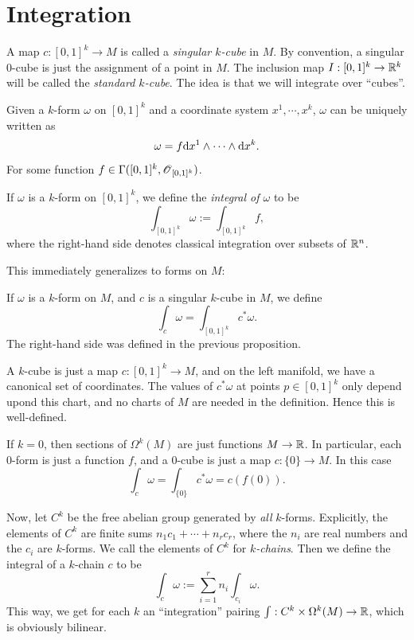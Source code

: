 \documentclass[11pt, english]{article}
\begin{document}
\newpage
\section{Integration}

A map $c:[0,1]^k \to M$ is called a \emph{singular $k$-cube} in $M$. By convention, a singular $0$-cube is just the assignment of a point in $M$. The inclusion map $I:[0,1]^k \to \mathbb{R}^k$ will be called the \emph{standard $k$-cube}. The idea is that we will integrate over ``cubes''.

Given a $k$-form $\omega$ on $[0,1]^k$ and a coordinate system $x^1,\cdots,x^k$, $\omega$ can be uniquely written as 
\[
 \omega = f \mathrm{d}{x}^1 \wedge \cdots \wedge \mathrm{d}{x}^k.
\]
For some function $f \in \Gamma([0,1]^k, \operatorname{\mathscr{O}}_{[0,1]^k})$. 
\begin{defi}
If $\omega$ is a $k$-form on $[0,1]^k$, we define the \emph{integral of $\omega$} to be
\[
\int_{[0,1]^k} \omega := \int_{[0,1]^k} f,
\]
where the right-hand side denotes classical integration over subsets of $\mathbb{R}^n$.
\end{defi}

This immediately generalizes to forms on $M$:
\begin{defi}
  If $\omega$ is a $k$-form on $M$, and $c$ is a singular $k$-cube in $M$, we define
\[
\int_c \omega = \int_{[0,1]^k} c^\ast \omega.
\]
The right-hand side was defined in the previous proposition.
\end{defi}
\begin{remark}
A $k$-cube is just a map $c:[0,1]^k \to M$, and on the left manifold, we have a canonical set of coordinates. The values of $c^\ast \omega$ at points $p \in [0,1]^k$ only depend upond this chart, and no charts of $M$ are needed in the definition. Hence this is well-defined.
\end{remark}
\begin{remark}
  If $k=0$, then sections of $\Omega^k(M)$ are just functions $M \to \mathbb{R}$. In particular, each $0$-form is just a function $f$, and a $0$-cube is just a map $c:\{ 0 \} \to M$. In this case
\[
\int_c \omega = \int_{\{ 0 \}} c^\ast \omega = c(f(0)).
\]
\end{remark}

Now, let $C^k$ be the free abelian group generated by \emph{all} $k$-forms. Explicitly, the elements of $C^k$ are finite sums $n_1c_1+\cdots+n_rc_r$, where the $n_i$ are real numbers and the $c_i$ are $k$-forms. We call the elements of $C^k$ for \emph{$k$-chains}. Then we define the integral of a $k$-chain $c$ to be
\[
\int_c \omega := \sum_{i=1}^r n_i \int_{c_i} \omega.
\]
This way, we get for each $k$ an ``integration'' pairing $\int:C^k \times \Omega^k(M) \to \mathbb{R}$, which is obviously bilinear.
\end{document}
